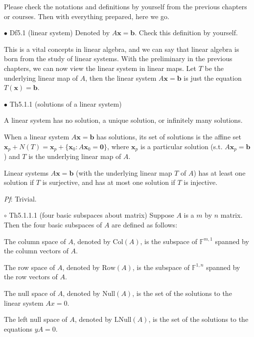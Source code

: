 \documentclass{article}
\begin{document}
Please check the notations and definitions by yourself from the previous chapters or courses. Then with everything prepared, here we go.

\begin{Df}{$\bullet$ Df5.1 (linear system)}
    Denoted by $A\pmb{x} = \pmb{b}$. Check this definition by yourself.
\end{Df}

\begin{Rmk}{}
    This is a vital concepts in linear algebra, and we can say that linear algebra is born from the study of linear systems. With the preliminary in the previous chapters, we can now view the linear system in linear maps. Let $T$ be the underlying linear map of $A$, then the linear system $A\pmb{x} = \pmb{b}$ is just the equation $T(\pmb{x}) = \pmb{b}$. 
\end{Rmk}

\begin{Th}{$\bullet$ Th5.1.1 (solutions of a linear system)}
    \begin{compactenum}
        \item A linear system has no solution, a unique solution, or infinitely many solutions.
        \item When a linear system $A\pmb{x} = \pmb{b}$ has solutions, its set of solutions is the affine set $\pmb{x}_p + N(T) = \pmb{x}_p + \{\pmb{x}_0: A\pmb{x}_0 = \pmb{0}\}$, where $\pmb{x}_p$ is a particular solution (s.t. $A\pmb{x}_p = \pmb{b}$) and $T$ is the underlying linear map of $A$.
        \item Linear systems $A\pmb{x} = \pmb{b}$ (with the underlying linear map $T$ of $A$) has at least one solution if $T$ is surjective, and has at most one solution if $T$ is injective. 
    \end{compactenum}
    \tcblower
    \textit{Pf}: Trivial.
\end{Th}

\begin{Df}{$\circ$ Th5.1.1.1 (four basic subspaces about matrix)}
    Suppose $A$ is a $m$ by $n$ matrix. Then the four basic subspaces of $A$ are defined as follows:
    \begin{compactenum}
        \item The column space of $A$, denoted by $\text{Col}(A)$, is the subspace of $\mathbb{F}^{m,1}$ spanned by the column vectors of $A$.
        \item The row space of $A$, denoted by $\text{Row}(A)$, is the subspace of $\mathbb{F}^{1,n}$ spanned by the row vectors of $A$.
        \item The null space of $A$, denoted by $\text{Null}(A)$, is the set of the solutions to the linear system $Ax = 0$.
        \item The left null space of $A$, denoted by $\text{LNull}(A)$, is the set of the solutions to the equations $yA = 0$.
    \end{compactenum}
\end{Df}
\end{document}

